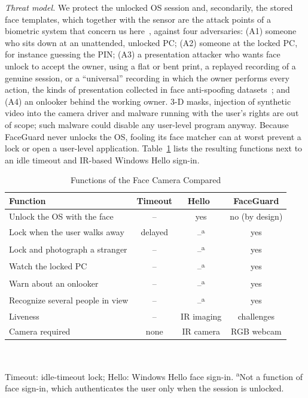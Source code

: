 \documentclass{ieeeaccess}
\begin{document}
\emph{Threat model.} We protect the unlocked OS session and, secondarily, the stored face templates, which together with the sensor are the attack points of a biometric system that concern us here~\cite{ratha2001enhancing}, against four adversaries: (A1) someone who sits down at an unattended, unlocked PC; (A2) someone at the locked PC, for instance guessing the PIN; (A3) a presentation attacker who wants face unlock to accept the owner, using a flat or bent print, a replayed recording of a genuine session, or a ``universal'' recording in which the owner performs every action, the kinds of presentation collected in face anti-spoofing datasets~\cite{zhang2012casiafasd}; and (A4) an onlooker behind the working owner. 3-D masks, injection of synthetic video into the camera driver and malware running with the user's rights are out of scope; such malware could disable any user-level program anyway. Because FaceGuard never unlocks the OS, fooling its face matcher can at worst prevent a lock or open a user-level application. Table~\ref{tab:compare} lists the resulting functions next to an idle timeout and IR-based Windows Hello sign-in.

\begin{table}[!t]
\centering
\caption{Functions of the Face Camera Compared}
\label{tab:compare}
\footnotesize
\setlength{\tabcolsep}{3pt}
\begin{tabular}{@{}lccc@{}}
\toprule
Function & Timeout & Hello~\cite{ms2024hello} & FaceGuard \\
\midrule
Unlock the OS with the face & -- & yes & no (by design) \\
Lock when the user walks away & delayed & --\textsuperscript{a} & yes \\
Lock and photograph a stranger & -- & --\textsuperscript{a} & yes \\
Watch the locked PC & -- & --\textsuperscript{a} & yes \\
Warn about an onlooker & -- & --\textsuperscript{a} & yes \\
Recognize several people in view & -- & --\textsuperscript{a} & yes \\
Liveness & -- & IR imaging & challenges \\
Camera required & none & IR camera & RGB webcam \\
\bottomrule
\end{tabular}\\[2pt]
\raggedright\scriptsize Timeout: idle-timeout lock; Hello: Windows Hello face sign-in. \textsuperscript{a}Not a function of face sign-in, which authenticates the user only when the session is unlocked.
\end{table}
\end{document}
